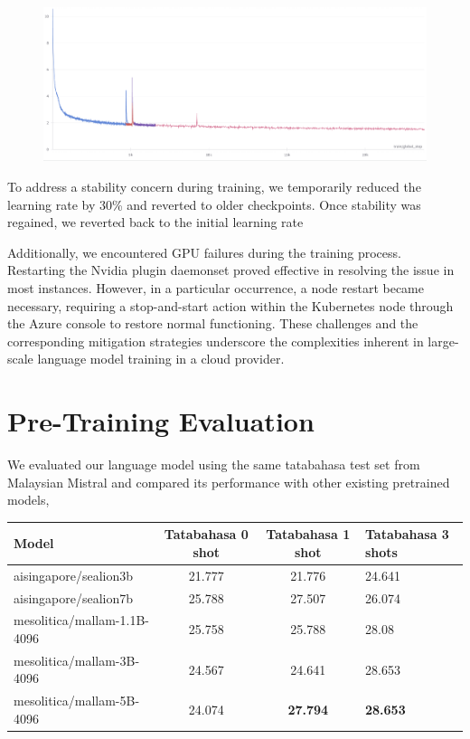 \documentclass[preprint]{article}
\begin{document}
\begin{figure}[h]
  \centering
  \includegraphics[width=0.6\linewidth]{pic/hiccup.png} %
\end{figure}

To address a stability concern during training, we temporarily reduced the learning rate by 30\% and reverted to older checkpoints. Once stability was regained, we reverted back to the initial learning rate

Additionally, we encountered GPU failures during the training process. Restarting the Nvidia plugin daemonset proved effective in resolving the issue in most instances. However, in a particular occurrence, a node restart became necessary, requiring a stop-and-start action within the Kubernetes node through the Azure console to restore normal functioning. These challenges and the corresponding mitigation strategies underscore the complexities inherent in large-scale language model training in a cloud provider.

\section{Pre-Training Evaluation}

We evaluated our language model using the same tatabahasa test set from Malaysian Mistral \cite{zolkepli2024large} and compared its performance with other existing pretrained models,

\begin{table}[h]
  \centering
  \begin{tabular}{lccl}
    \hline
    \textbf{Model}              & \textbf{Tatabahasa 0 shot} & \textbf{Tatabahasa 1 shot} & \textbf{Tatabahasa 3 shots} \\
    \hline
    aisingapore/sealion3b       & 21.777                     & 21.776                     & 24.641                      \\
    aisingapore/sealion7b       & 25.788                     & 27.507                     & 26.074                      \\
    mesolitica/mallam-1.1B-4096 & 25.758                     & 25.788                     & 28.08                       \\
    mesolitica/mallam-3B-4096   & 24.567                     & 24.641                     & 28.653                      \\
    mesolitica/mallam-5B-4096   & 24.074                     & \textbf{27.794}            & \textbf{28.653}             \\
    \hline
  \end{tabular}
\end{table}
\end{document}
